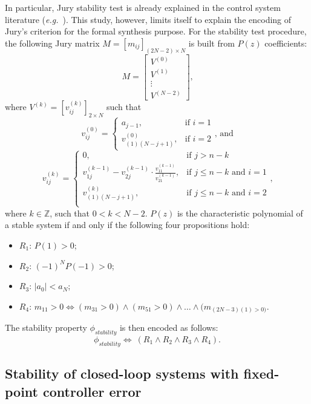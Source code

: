 \documentclass[runningheads,a4paper]{llncs}
\begin{document}
In particular, Jury stability test is already explained in the control system 
literature ({\it e.g.}~\cite{fadali}). This study, however, limits itself to 
explain the encoding of Jury's criterion for the formal synthesis purpose. 
For the stability  test procedure, the following Jury matrix 
$M=[m_{ij}]_{(2N-2)\times N}$ is built  from $P(z)$ coefficients:
$$
M=\left[
\begin{matrix}
  V^{(0)} \\
  V^{(1)} \\
  \vdots \\
  V^{(N-2)}
 \end{matrix}
\right]\mbox{,}
$$
\noindent where $V^{(k)}=[v^{(k)}_{ij}]_{2\times N}$ such that
$$
v^{(0)}_{ij}=\begin{cases} 
a_{j-1}, & \mbox{if } i=1 \\   v^{(0)}_{(1)(N-j+1)}, & \mbox{if } i=2 
\end{cases}\mbox{, and} 
$$
$$
v^{(k)}_{ij}=\begin{cases} 
0, & \mbox{if } j>n-k\\
v^{(k-1)}_{1j}-v^{(k-1)}_{2j}\cdot\frac{v^{(k-1)}_{11}}{v^{(k-1)}_{21}}, & \mbox{if } j\leq n-k  \mbox{ and } i=1 \\
v^{(k)}_{(1)(N-j+1)}, & \mbox{if } j\leq n-k \mbox{ and } i=2 \\
\end{cases} \mbox{,}
$$
\noindent where $k\in\mathbb{Z}$, such that $0<k<N-2$. $P(z)$ is the 
characteristic polynomial of a stable system if and only if the following 
four propositions hold:
\begin{itemize}
\item $R_{1}$: $P(1)>0$;
\item $R_{2}$: $(-1)^{N}P(-1)>0$;
\item $R_{3}$: $\vert{a_{0}}\vert <a_{N}$;
\item $R_{4}$: $m_{11}>0\iff (m_{31}>0)\wedge (m_{51}>0)\wedge \dots \wedge (m_{(2N-3)(1)>0)}$.
\end{itemize}

The stability property $\phi_{stability}$ is then encoded as follows:
$$
\phi_{stability}\iff \ (R_{1} \wedge R_{2} \wedge R_{3} \wedge R_{4}).
$$

\subsection{Stability of closed-loop systems with fixed-point controller error}
\end{document}
